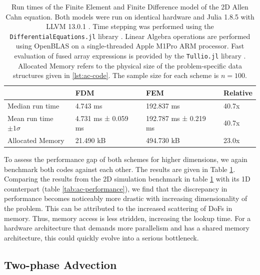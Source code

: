 \documentclass[asi,article,submit,moreauthors]{Definitions/mdpi}
\begin{document}
\begin{table}
    \centering
    \caption{Run times of the Finite Element and Finite Difference model of the 2D Allen Cahn equation. Both models were run on identical hardware and Julia 1.8.5 with LLVM 13.0.1 \cite{bezansonJuliaFreshApproach2017}. Time stepping was performed using the \texttt{DifferentialEquations.jl} library \cite{rackauckasDifferentialequationsJlPerformant2017}. Linear Algebra operations are performed using OpenBLAS \cite{wangAUGEMAutomaticallyGenerate2013,xianyiModeldriven} on a single-threaded Apple M1Pro ARM processor. Fast evaluation of fused array expressions is provided by the \texttt{Tullio.jl} library \cite{abbottMcabbottTullioJl2022}. Allocated Memory refers to the physical size of the problem-specific data structures given in \ref{lst:ac-code}. The sample size for each scheme is $n=100$.}
    \label{tab:ac2d-performance}
    \begin{tabular}{llll} 
    \toprule
                                & \textbf{FDM}                 & \textbf{FEM}                   & \textbf{Relative}  \\
                                \midrule
    Median run time             & 4.743 ms            & 192.837 ms             & 40.7x    \\
    Mean run time $\pm 1\sigma$ & 4.731 ms ± 0.059 ms & 192.787 ms ±  0.219 ms & 40.7x    \\
    Allocated Memory            & 21.490 kB            & 494.730 kB              & 23.0x  \\
    \bottomrule
    \end{tabular}
    \end{table}

To assess the performance gap of both schemes for higher dimensions, we again benchmark both codes against each other.
The results are given in Table \ref{tab:ac2d-performance}.
Comparing the results from the 2D simulation benchmark in table \ref{tab:ac2d-performance} with its 1D counterpart (table \ref{tab:ac-performance}), we find that the discrepancy in performance becomes noticeably more drastic with increasing dimensionality of the problem.
This can be attributed to the increased scattering of DoFs in memory.
Thus, memory access is less stridden, increasing the lookup time.
For a hardware architecture that demands more parallelism and has a shared memory architecture, this could quickly evolve into a serious bottleneck.

\subsection{Two-phase Advection}\label{sec:advection-equation}
\end{document}
